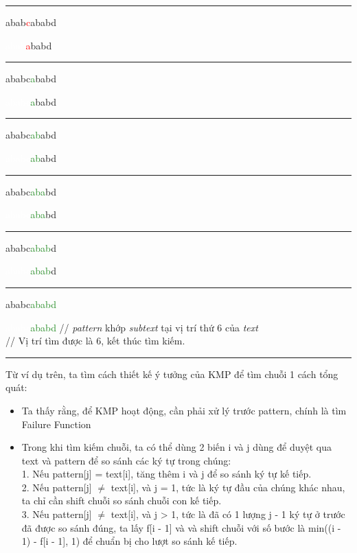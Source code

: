\documentclass[a4paper,11pt]{article}
\begin{document}
			\vspace*{2mm}
			\hrule
			abab\textcolor{red}{c}ababd
			
			\textcolor{white}{abab}\textcolor{red}{a}babd 		

			\vspace*{2mm}
			\hrule
			ababc\textcolor{ForestGreen}{a}babd
			
			\textcolor{white}{ababc}\textcolor{ForestGreen}{a}babd 

			\vspace*{2mm}
			\hrule
			ababc\textcolor{ForestGreen}{ab}abd
			
			\textcolor{white}{ababc}\textcolor{ForestGreen}{ab}abd 

			\vspace*{2mm}
			\hrule
			ababc\textcolor{ForestGreen}{aba}bd
			
			\textcolor{white}{ababc}\textcolor{ForestGreen}{aba}bd 

			\vspace*{2mm}
			\hrule
			ababc\textcolor{ForestGreen}{abab}d
			
			\textcolor{white}{ababc}\textcolor{ForestGreen}{abab}d 

			\vspace*{2mm}
			\hrule
			ababc\textcolor{ForestGreen}{ababd}
			
			\textcolor{white}{ababc}\textcolor{ForestGreen}{ababd} 				\hspace*{0.8cm} // \textit{pattern} khớp \textit{subtext} tại vị trí thứ 6 của \textit{text}\\
															\hspace*{2.9cm} // Vị trí tìm được là 6, kết thúc tìm kiếm.
			
			\vspace*{2mm}
			\hrule			
					
			Từ ví dụ trên, ta tìm cách thiết kế ý tưởng của KMP để tìm chuỗi 1 cách tổng quát:
			\begin{itemize}
				\item Ta thấy rằng, để KMP hoạt động, cần phải xử lý trước pattern, chính là tìm Failure Function
				\item Trong khi tìm kiếm chuỗi, ta có thể dùng 2 biến i và j dùng để duyệt qua text và pattern để so sánh các ký tự trong chúng: \\
				1. Nếu pattern[j] = text[i], tăng thêm i và j để so sánh ký tự kế tiếp. \\
				2. Nếu pattern[j] $\neq$ text[i], và j = 1, tức là ký tự đầu của chúng khác nhau, ta chỉ cần shift chuỗi so sánh chuỗi con kế tiếp.\\
				3. Nếu pattern[j] $\neq$ text[i], và j > 1, tức là đã có 1 lượng j - 1 ký tự ở trước đã được so sánh đúng, ta lấy f[i - 1] 
				và và shift chuỗi với số bước là min((i - 1) - f[i - 1], 1) để chuẩn bị cho lượt so sánh kế tiếp.
			\end{itemize}
			
\end{document}
